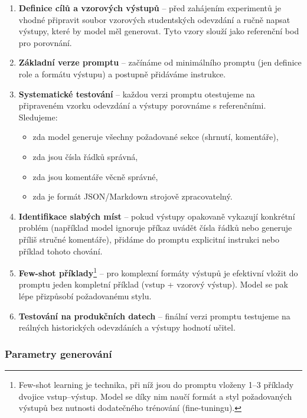 \begin{enumerate}
    \item \textbf{Definice cílů a vzorových výstupů} -- před zahájením experimentů je vhodné připravit soubor vzorových studentských odevzdání a ručně napsat  výstupy, které by model měl generovat.
    Tyto vzory slouží jako referenční bod pro porovnání.

    \item \textbf{Základní verze promptu} -- začínáme od minimálního promptu (jen definice role a formátu výstupu) a postupně přidáváme instrukce.

    \item \textbf{Systematické testování} -- každou verzi promptu otestujeme na připraveném vzorku odevzdání a výstupy porovnáme s referenčními.
    Sledujeme:
    \begin{itemize}
        \item zda model generuje všechny požadované sekce (shrnutí, komentáře),
        \item zda jsou čísla řádků správná,
        \item zda jsou komentáře věcně správné,
        \item zda je formát JSON/Markdown strojově zpracovatelný.
    \end{itemize}

    \item \textbf{Identifikace slabých míst} -- pokud výstupy opakovaně vykazují konkrétní problém (například model ignoruje příkaz uvádět čísla řádků nebo generuje příliš stručné komentáře), přidáme do promptu explicitní instrukci nebo příklad tohoto chování.

    \item \textbf{Few-shot příklady}\footnote{Few-shot learning je technika, při níž jsou do promptu vloženy 1--3 příklady dvojice vstup--výstup. Model se díky nim naučí formát a styl požadovaných výstupů bez nutnosti dodatečného trénování (fine-tuningu).}
    -- pro komplexní formáty výstupů je efektivní vložit do promptu jeden kompletní příklad (vstup + vzorový výstup). Model se pak lépe přizpůsobí požadovanému stylu.

    \item \textbf{Testování na produkčních datech} -- finální verzi promptu testujeme na reálných historických odevzdáních a výstupy hodnotí učitel.
\end{enumerate}

\subsubsection*{Parametry generování}

